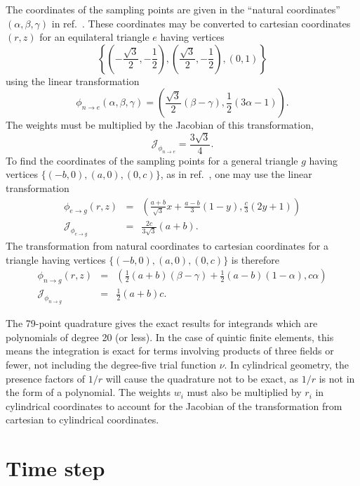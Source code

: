 \documentclass[letterpaper]{book}
\begin{document}
The coordinates of the sampling points are given in the ``natural
coordinates'' $(\alpha, \beta, \gamma)$ in ref.~\cite{Dunavant85}.
These coordinates may be converted to cartesian coordinates $(r, z)$
for an equilateral triangle $e$ having vertices
\[
\left\{\left(-\frac{\sqrt{3}}{2},-\frac{1}{2}\right),
\left(\frac{\sqrt{3}}{2},-\frac{1}{2}\right), (0,1)\right\} 
\]
using the linear transformation
\[ 
\phi_{n \to e}(\alpha, \beta, \gamma) = 
\left(\frac{\sqrt{3}}{2}(\beta-\gamma), \frac{1}{2}(3 \alpha - 1)
\right).
\]
The weights must be multiplied by the Jacobian of this transformation,
\[
\mathcal{J}_{\phi_{n \to e}} = \frac{3 \sqrt{3}}{4}.
\]
To find the coordinates of the sampling points for a general triangle
$g$ having vertices $\{(-b,0), (a,0), (0,c)\}$, as in
ref.~\cite{Jardin04}, one may use the linear transformation
\begin{eqnarray*}
  \phi_{e \to g}(r,z) & = & 
    \left(\frac{a+b}{\sqrt{3}} x + \frac{a-b}{3} (1-y), 
    \frac{c}{3}(2y+1) \right) \\
  \mathcal{J}_{\phi_{e \to g}} & = &  \frac{2 c}{3 \sqrt{3}} (a+b).
\end{eqnarray*}
The transformation from natural coordinates to cartesian coordinates
for a triangle having vertices $\{(-b,0), (a,0), (0,c)\}$ is therefore
\begin{eqnarray*}
  \phi_{n \to g}(r,z) & = & 
  \left(\frac{1}{2} (a+b) (\beta-\gamma) +
  \frac{1}{2} (a-b)(1-\alpha), c \alpha \right) \\
  \mathcal{J}_{\phi_{n \to g}} & = & \frac{1}{2} (a+b) c.
\end{eqnarray*}

The 79-point quadrature gives the exact results for integrands which
are polynomials of degree 20 (or less).  In the case of quintic finite
elements, this means the integration is exact for terms involving
products of three fields or fewer, not including the degree-five
trial function $\nu$.  In cylindrical geometry, the presence factors
of $1/r$ will cause the quadrature not to be exact, as $1/r$ is not in
the form of a polynomial.  The weights $w_i$ must also be multiplied
by $r_i$ in cylindrical coordinates to account for the Jacobian of the
transformation from cartesian to cylindrical coordinates.


\section{Time step}
\end{document}
